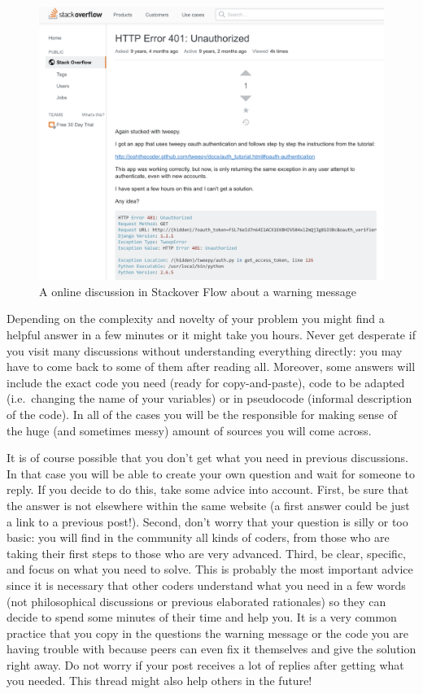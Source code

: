 \begin{figure}
\centering
\includegraphics[width=0.9\linewidth]{figures/ch4_stackover.png}
\caption{A online discussion in Stackover Flow about a warning message }
\label{fig:stackover}
\end{figure}

Depending on the complexity and novelty of your problem you might  find a helpful answer in a few minutes or it might take you hours. Never get desperate if you visit many discussions without understanding everything directly: you may have to come back to some of them after reading all. Moreover, some answers will include the exact code you need (ready for copy-and-paste), code to be adapted (i.e.\ changing the name of your variables) or in pseudocode (informal description of the code). In all of the cases you will be the responsible for making sense of the huge (and sometimes messy) amount of sources you will come across.

It is of course possible that you don't get what you need in previous discussions. In that case you will be able to create your own question and wait for someone to reply. If you decide to do this, take some advice into account. First, be sure that the answer is not elsewhere within the same website (a first answer could be just a link to a previous post!). Second, don't worry that your question is silly or too basic: you will find in the community all kinds of coders, from those who are taking their first steps to those who are very advanced. Third, be clear, specific, and focus on what you need to solve. This is probably the most important advice since it is necessary that other coders understand what you need in a few words (not philosophical discussions or previous elaborated rationales)  so they can decide to spend some minutes of their time and help you. It is a very common practice that you copy in the questions the warning message or the code you are having trouble with because peers can even fix it themselves and give the solution right away. Do not worry if your post receives a lot of replies after getting what you needed. This thread might also help others in the future!



